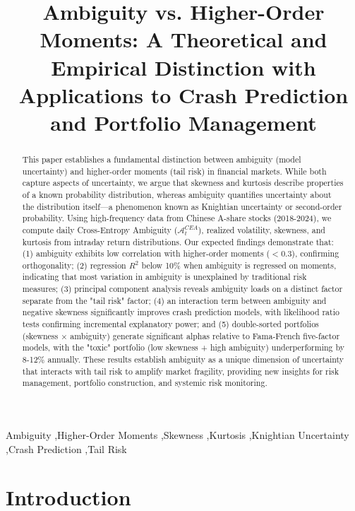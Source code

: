 \documentclass[preprint,12pt,authoryear]{elsarticle}
\begin{document}
\begin{frontmatter}

\title{Ambiguity vs. Higher-Order Moments: A Theoretical and Empirical Distinction with Applications to Crash Prediction and Portfolio Management}

\begin{abstract}
This paper establishes a fundamental distinction between ambiguity (model uncertainty) and higher-order moments (tail risk) in financial markets. While both capture aspects of uncertainty, we argue that skewness and kurtosis describe properties of a known probability distribution, whereas ambiguity quantifies uncertainty about the distribution itself—a phenomenon known as Knightian uncertainty or second-order probability. Using high-frequency data from Chinese A-share stocks (2018-2024), we compute daily Cross-Entropy Ambiguity ($\mathcal{A}^{CEA}_t$), realized volatility, skewness, and kurtosis from intraday return distributions. Our expected findings demonstrate that: (1) ambiguity exhibits low correlation with higher-order moments ($<0.3$), confirming orthogonality; (2) regression $R^2$ below 10\% when ambiguity is regressed on moments, indicating that most variation in ambiguity is unexplained by traditional risk measures; (3) principal component analysis reveals ambiguity loads on a distinct factor separate from the "tail risk" factor; (4) an interaction term between ambiguity and negative skewness significantly improves crash prediction models, with likelihood ratio tests confirming incremental explanatory power; and (5) double-sorted portfolios (skewness × ambiguity) generate significant alphas relative to Fama-French five-factor models, with the "toxic" portfolio (low skewness + high ambiguity) underperforming by 8-12\% annually. These results establish ambiguity as a unique dimension of uncertainty that interacts with tail risk to amplify market fragility, providing new insights for risk management, portfolio construction, and systemic risk monitoring.
\end{abstract}

\begin{keyword}
Ambiguity \sep Higher-Order Moments \sep Skewness \sep Kurtosis \sep Knightian Uncertainty \sep Crash Prediction \sep Tail Risk
\end{keyword}

\end{frontmatter}

\section{Introduction}
\end{document}
